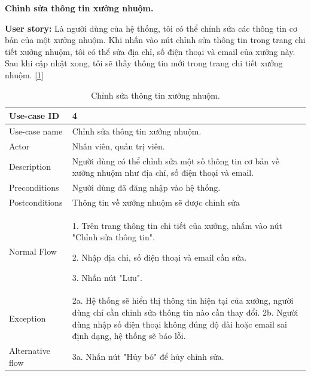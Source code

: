 \newpage
\textbf{Chỉnh sửa thông tin xưởng nhuộm.}\par
\textbf{User story:} Là người dùng của hệ thống, tôi có thể chỉnh sửa các thông tin cơ bản của một xưởng nhuộm. Khi nhấn vào nút chỉnh sửa thông tin trong trang chi tiết xưởng nhuộm, tôi có thể sửa địa chỉ, số điện thoại và email của xưởng này. Sau khi cập nhật xong, tôi sẽ thấy thông tin mới trong trang chi tiết xưởng nhuộm. [\ref{bang4}]
\begin{table}[!htp]
    \centering
    \begin{tabular}{|m{3cm}|m{10cm}|}
    \hline 
        Use-case ID & 4\\ \hline
        Use-case name & Chỉnh sửa thông tin xưởng nhuộm.\\ \hline
        Actor & Nhân viên, quản trị viên.\\ \hline
        Description & Người dùng có thể chỉnh sửa một số thông tin cơ bản về xưởng nhuộm như địa chỉ, số điện thoại và email.\\ \hline
        Preconditions & Người dùng đã đăng nhập vào hệ thống.\\ \hline
        Postconditions & Thông tin về xưởng nhuộm sẽ được chỉnh sửa\\ \hline
        Normal Flow & 
        1. Trên trang thông tin chi tiết của xưởng, nhấm vào nút "Chỉnh sửa thông tin".\par
        2. Nhập địa chỉ, số điện thoại và email cần sửa.\par
        3. Nhấn nút "Lưu".
        \\ \hline
        Exception & 
        2a. Hệ thống sẽ hiển thị thông tin hiện tại của xưởng, người dùng chỉ cần chỉnh sửa thông tin nào cần thay đổi.
        2b. Người dùng nhập số điện thoại không đúng độ dài hoặc email sai định dạng, hệ thống sẽ báo lỗi.
        \\ \hline
        Alternative flow & 
        3a. Nhấn nút "Hủy bỏ" để hủy chỉnh sửa.
        \\ 
    \hline 
    \end{tabular}
    \caption{Chỉnh sửa thông tin xưởng nhuộm.}
    \label{bang4}
\end{table}

